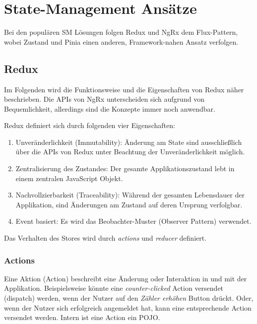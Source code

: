 \chapter{State-Management Ansätze} \label{sm-ansaetze}

Bei den populären SM Lösungen folgen Redux und NgRx dem Flux-Pattern\cite{historyOfRedux}\cite{ngrxGettingStarted}, wobei Zustand und Pinia einen anderen, Framework-nahen Ansatz verfolgen.

\section{Redux}

Im Folgenden wird die Funktionsweise und die Eigenschaften von Redux näher beschrieben. Die APIs von NgRx unterscheiden sich aufgrund von Bequemlichkeit, allerdings sind die Konzepte immer noch anwendbar.

Redux definiert sich durch folgenden vier Eigenschaften:
\begin{enumerate}
  \item Unveränderlichkeit (Immutability): Änderung am State sind ausschließlich über die APIs von Redux unter Beachtung der Unveränderlichkeit möglich.
  \item Zentralisierung des Zustandes: Der gesamte Applikationszustand lebt in einem zentralen JavaScript Objekt.
  \item Nachvollzierbarkeit (Traceability): Während der gesamten Lebensdauer der Applikation, sind Änderungen am Zustand auf deren Ursprung verfolgbar.
  \item Event basiert: Es wird das Beobachter-Muster (Observer Pattern) verwendet.
\end{enumerate}

Das Verhalten des Stores wird durch \textit{actions} und \textit{reducer} definiert.

\subsection{Actions}

Eine Aktion (Action) beschreibt eine Änderung oder Interaktion in und mit der Applikation. Beispielsweise könnte eine \textit{counter-clicked} Action versendet (dispatch) werden, wenn der Nutzer auf den \textit{Zähler erhöhen} Button drückt. Oder, wenn der Nutzer sich erfolgreich angemeldet hat, kann eine entsprechende Action versendet werden. Intern ist eine Action ein POJO.\cite{reduxStateActionReducers}

